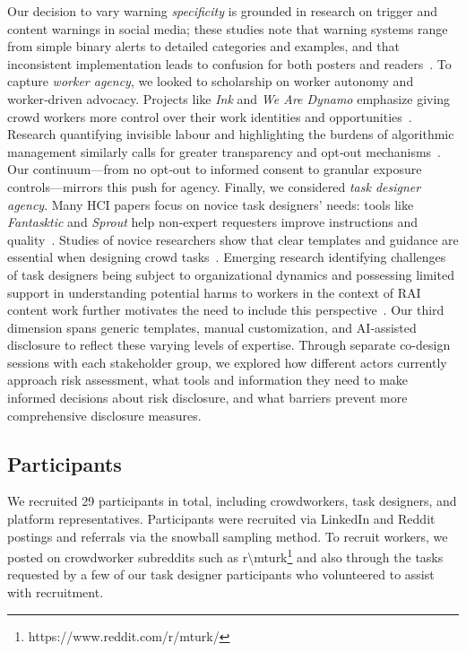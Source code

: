 Our decision to vary warning \emph{specificity} is grounded in research on trigger and content warnings in social media; these studies note that warning systems range from simple binary alerts to detailed categories and examples, and that inconsistent implementation leads to confusion for both posters and readers~\cite{Zhang2024PerceptionsTriggerWarnings, Hegde2023TriggerDetection, Bridgland2024Meta}. To capture \emph{worker agency}, we looked to scholarship on worker autonomy and worker‑driven advocacy. Projects like \emph{Ink} and \emph{We Are Dynamo} emphasize giving crowd workers more control over their work identities and opportunities~\cite{salehi2018ink,salehi2015we}. Research quantifying invisible labour and highlighting the burdens of algorithmic management similarly calls for greater transparency and opt‑out mechanisms~\cite{toxtli2021quantifying}. Our continuum---from no opt‑out to informed consent to granular exposure controls---mirrors this push for agency. Finally, we considered \emph{task designer agency}. Many HCI papers focus on novice task designers’ needs: tools like \emph{Fantasktic} and \emph{Sprout} help non‑expert requesters improve instructions and quality~\cite{gutheim2012fantasktic,bragg2018sprout}. Studies of novice researchers show that clear templates and guidance are essential when designing crowd tasks~\cite{papoutsaki2015crowdsourcing}. Emerging research identifying challenges of task designers being subject to organizational dynamics and possessing limited support in understanding potential harms to workers in the context of RAI content work further motivates the need to include this perspective~\cite{qian2025locating}. Our third dimension spans generic templates, manual customization, and AI‑assisted disclosure to reflect these varying levels of expertise. Through separate co-design sessions with each stakeholder group, we explored how different actors currently approach risk assessment, what tools and information they need to make informed decisions about risk disclosure, and what barriers prevent more comprehensive disclosure measures. 





\subsection{Participants}
We recruited 29 participants in total, including crowdworkers, task designers, and platform representatives. Participants were recruited via LinkedIn and Reddit postings and referrals via the snowball sampling method. To recruit workers, we posted on crowdworker subreddits such as r\textbackslash mturk\footnote{https://www.reddit.com/r/mturk/} and also through the tasks requested by a few of our task designer participants who volunteered to assist with recruitment. 

